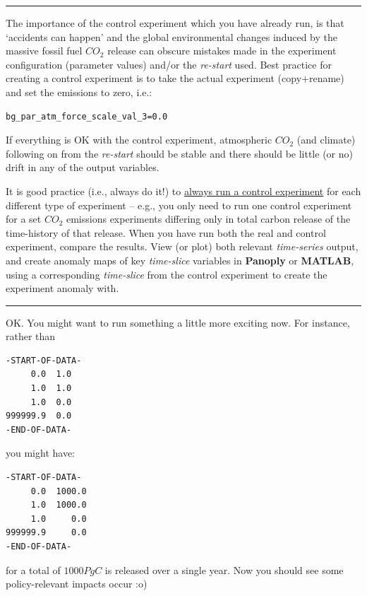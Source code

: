 \vspace{1mm} \noindent\rule{4cm}{0.1mm} \vspace{2mm}

\noindent The importance of the control experiment which you have already run, is that ‘accidents can happen’ and the global environmental changes induced by the massive fossil fuel \(CO_{2}\) release can obscure mistakes made in the experiment configuration (parameter values) and/or the \textit{re-start} used. Best practice for creating a control experiment is to take the actual experiment (copy+rename) and set the emissions to zero, i.e.:
\vspace{-0pt}\small\begin{verbatim}
bg_par_atm_force_scale_val_3=0.0
\end{verbatim}\normalsize\vspace{-2pt}

\vspace{1mm}
If everything is OK with the control experiment, atmospheric \(CO_{2}\) (and climate) following on from the \textit{re-start} should be stable and there should be little (or no) drift in any of the output variables.

\vspace{1mm}
It is good practice (i.e., always do it!) to \uline{always run a control experiment} for each different type of experiment – e.g., you only need to run one control experiment for a set \(CO_{2}\) emissions experiments differing only in total carbon release of the time-history of that release. When you have run both the real and control experiment, compare the results. View (or plot) both relevant \textit{time-series} output, and create anomaly maps of key \textit{time-slice} variables in \textbf{Panoply} or \textbf{MATLAB}, using a corresponding \textit{time-slice} from the control experiment to create the experiment anomaly with.

\vspace{1mm} \noindent\rule{4cm}{0.1mm} \vspace{2mm}

\noindent OK. You might want to run something a little more exciting now. For instance, rather than
\vspace{-2pt}\footnotesize\begin{verbatim}
-START-OF-DATA-
     0.0  1.0
     1.0  1.0
     1.0  0.0
999999.9  0.0
-END-OF-DATA-
\end{verbatim}\normalsize\vspace{-2pt}
you might have:
\vspace{-2pt}\footnotesize\begin{verbatim}
-START-OF-DATA-
     0.0  1000.0
     1.0  1000.0
     1.0     0.0
999999.9     0.0
-END-OF-DATA-
\end{verbatim}\normalsize\vspace{-2pt}
for a total of \(1000 PgC\) is released over a single year. Now you should see some policy-relevant impacts occur :o)

